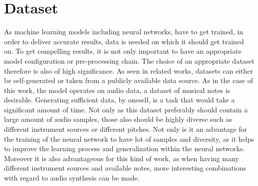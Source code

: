 \section{Dataset}
\label{sec:app_dataset}
As machine learning models including neural networks, have to get trained, in order to deliver accurate results, data is needed on which it should get trained on. To get compelling results, it is not only important to have an appropriate model configuration or pre-processing chain. The choice of an appropriate dataset therefore is also of high significance. As seen in related works, datasets can either be self-generated or taken from a publicly available data source. As in the case of this work, the model operates on audio data, a dataset of musical notes is desirable. Generating sufficient data, by oneself, is a task that would take a significant amount of time. Not only as this dataset preferably should contain a large amount of audio samples, those also should be highly diverse such as different instrument sources or different pitches. Not only is it an advantage for the training of the neural network to have lot of samples and diversity, as it helps to improve the learning process and generalization within the neural networks. Moreover it is also advantageous for this kind of work, as when having many different instrument sources and available notes, more interesting combinations with regard to audio synthesis can be made.


